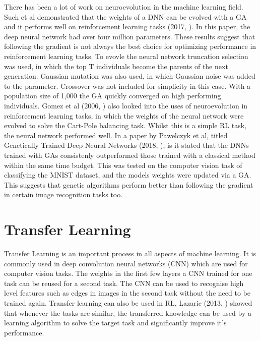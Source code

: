 There has been a lot of work on neuroevolution in the machine learning field. Such et al demonstrated that the weights of a DNN can be evolved with a GA and it performs well on reinforcement learning tasks (2017, \cite{such}). In this paper, the deep neural network had over four million parameters. These results suggest that following the gradient is not always the best choice for optimizing performance in reinforcement learning tasks. To evovle the neural network truncation selection was used, in which the top T individuals become the parents of the next generation. Gaussian mutation was also used, in which Gaussian noise was added to the parameter. Crossover was not included for simplicity in this case. With a population size of 1,000 the GA quickly converged on high performing individuals. Gomez et al (2006, \cite{gomez}) also looked into the uses of neuroevolution in reinforcement learning tasks, in which the weights of the neural network were evolved to solve the Cart-Pole balancing task. Whilst this is a simple RL task, the neural network performed well. In a paper by Pawelczyk et al, titled Genetically Trained Deep Neural Networks (2018, \cite{pawelczyk}), is it stated that the DNNs trained with GAs consistenly outperformed those trained with a classical method within the same time budget. This was tested on the computer vision task of classifying the MNIST dataset, and the models weights were updated via a GA. This suggests that genetic algorithms perform better than following the gradient in certain image recognition tasks too.

\section{Transfer Learning}

Transfer Learning is an important process in all aspects of machine learning. It is commonly used in deep convolution neural networks (CNN) which are used for computer vision tasks. The weights in the first few layers a CNN trained for one task can be reused for a second task. The CNN can be used to recognise high level features such as edges in images in the second task without the need to be trained again. Transfer learning can also be used in RL, Lazaric (2013, \cite{lazaric}) showed that whenever the tasks are similar, the transferred knowledge can be used by a learning algorithm to solve the target task and significantly improve it's performance.
